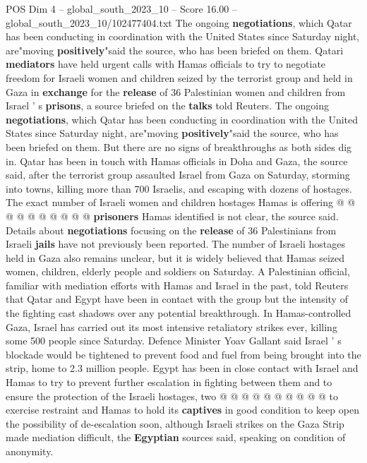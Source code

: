 \begin{textsample}{POS Dim 4 – global\_south\_2023\_10 – Score 16.00 – global\_south\_2023\_10/102477404.txt}  \label{ex:f4_pos_421}
The ongoing \textbf{negotiations}, which Qatar has been conducting in coordination with the United States since Saturday night, are"moving \textbf{positively}"said the source, who has been briefed on them.
Qatari \textbf{mediators} have held urgent calls with Hamas officials to try to negotiate freedom for Israeli women and children seized by the terrorist group and held in Gaza in \textbf{exchange} for the \textbf{release} of 36 Palestinian women and children from Israel ' s \textbf{prisons}, a source briefed on the \textbf{talks} told Reuters.
The ongoing \textbf{negotiations}, which Qatar has been conducting in coordination with the United States since Saturday night, are"moving \textbf{positively}"said the source, who has been briefed on them.
But there are no signs of breakthroughs as both sides dig in.
Qatar has been in touch with Hamas officials in Doha and Gaza, the source said, after the terrorist group assaulted Israel from Gaza on Saturday, storming into towns, killing more than 700 Israelis, and escaping with dozens of hostages.
The exact number of Israeli women and children hostages Hamas is offering @ @ @ @ @ @ @ @ @ @ \textbf{prisoners} Hamas identified is not clear, the source said.
Details about \textbf{negotiations} focusing on the \textbf{release} of 36 Palestinians from Israeli \textbf{jails} have not previously been reported.
The number of Israeli hostages held in Gaza also remains unclear, but it is widely believed that Hamas seized women, children, elderly people and soldiers on Saturday.
A Palestinian official, familiar with mediation efforts with Hamas and Israel in the past, told Reuters that Qatar and Egypt have been in contact with the group but the intensity of the fighting cast shadows over any potential breakthrough.
In Hamas-controlled Gaza, Israel has carried out its most intensive retaliatory strikes ever, killing some 500 people since Saturday.
Defence Minister Yoav Gallant said Israel ' s blockade would be tightened to prevent food and fuel from being brought into the strip, home to 2.3 million people.
Egypt has been in close contact with Israel and Hamas to try to prevent further escalation in fighting between them and to ensure the protection of the Israeli hostages, two @ @ @ @ @ @ @ @ @ @ to exercise restraint and Hamas to hold its \textbf{captives} in good condition to keep open the possibility of de-escalation soon, although Israeli strikes on the Gaza Strip made mediation difficult, the \textbf{Egyptian} sources said, speaking on condition of anonymity.

\end{textsample}
